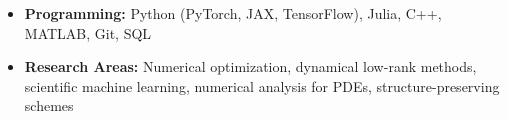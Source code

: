 \begin{itemize}
  \item \textbf{Programming:} Python (PyTorch, JAX, TensorFlow), Julia, C++, MATLAB, Git, SQL
  \item \textbf{Research Areas:} Numerical optimization, dynamical low-rank methods, scientific machine learning, numerical analysis for PDEs, structure-preserving schemes
\end{itemize}
